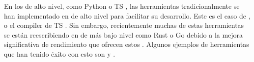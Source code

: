 En los  de alto nivel, como Python
\parencite{Python} o \gls{TS} \parencite{typescript}, las herramientas
tradicionalmente se han implementado en  de alto nivel para facilitar su desarrollo. Este es el caso
de ,  o el \gls{compiler} de \gls{TS}
\parencite{tsc}. Sin embargo, recientemente muchas de estas herramientas se
están reescribiendo en  de más bajo
nivel como Rust \parencite{Rust} o Go \parencite{Go} debido a la mejora
significativa de rendimiento que ofrecen estos  \parencite{typescript-go}. Algunos ejemplos de herramientas
que han tenido éxito con esto son  y .
